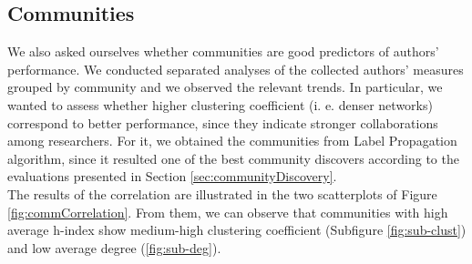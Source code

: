 \documentclass[sigchi]{acmart}
\begin{document}
\subsection{Communities}
We also asked ourselves whether communities are good predictors of authors' performance. We conducted separated analyses of the collected authors' measures grouped by community and we observed the relevant trends. In particular, we wanted to assess whether higher clustering coefficient (i. e. denser networks) correspond to better performance, since they indicate stronger collaborations among researchers. For it, we obtained the communities from Label Propagation algorithm, since it resulted one of the best community discovers according to the evaluations presented in Section \ref{sec:communityDiscovery}.\\
The results of the correlation are illustrated in the two scatterplots of Figure \ref{fig:commCorrelation}. From them, we can observe that communities with high average h-index show medium-high clustering coefficient (Subfigure \ref{fig:sub-clust}) and low average degree (\ref{fig:sub-deg}). 
\end{document}
